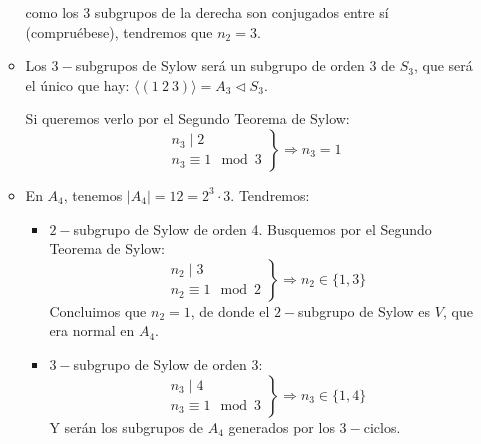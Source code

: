 \begin{ejemplo}
\begin{itemize}
\begin{itemize}
                    como los 3 subgrupos de la derecha son conjugados entre sí (compruébese), tendremos que $n_2 = 3$.

                \item Los $3-$subgrupos de Sylow será un subgrupo de orden 3 de $S_3$, que será el único que hay: $\langle (1\ 2\ 3) \rangle  = A_3 \lhd S_3$. 

                    Si queremos verlo por el Segundo Teorema de Sylow:
                    \begin{equation*}
                        \left.\begin{array}{r}
                            n_3 \mid 2 \\
                            n_3 \equiv 1 \mod 3
                    \end{array}\right\} \Longrightarrow n_3 = 1
                    \end{equation*}
                \item En $A_4$, tenemos $|A_4| = 12 = 2^3 \cdot 3$. Tendremos:
                    \begin{itemize}
                        \item $2-$subgrupo de Sylow de orden 4. Busquemos por el Segundo Teorema de Sylow:
                            \begin{equation*}
                                \left.\begin{array}{r}
                                    n_2 \mid 3 \\
                                    n_2 \equiv 1 \mod 2
                            \end{array}\right\} \Longrightarrow n_2 \in \{1,3\}
                            \end{equation*}
                            Concluimos que $n_2 = 1$, de donde el $2-$subgrupo de Sylow es $V$, que era normal en $A_4$.
                        \item $3-$subgrupo de Sylow de orden 3:
                            \begin{equation*}
                                \left.\begin{array}{r}
                                    n_3 \mid 4 \\
                                    n_3 \equiv 1 \mod 3
                                \end{array}\right\} \Longrightarrow n_3 \in \{1,4\} 
                            \end{equation*}
                            Y serán los subgrupos de $A_4$ generados por los $3-$ciclos.

\end{itemize}
\end{itemize}
\end{itemize}
\end{ejemplo}
